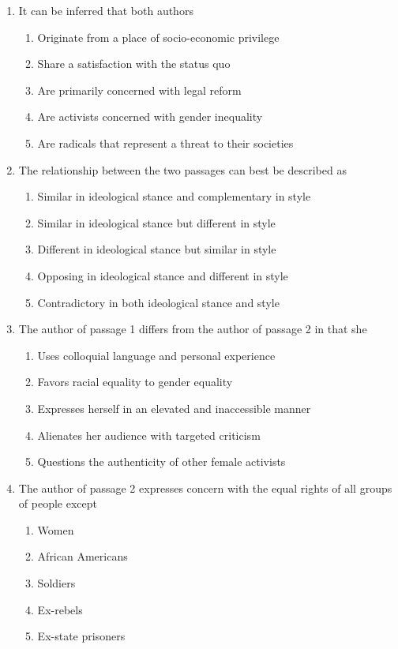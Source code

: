 \documentclass[12pt]{book}
\begin{document}
\bigskip
\begin{enumerate}
\item It can be inferred that both authors
\begin{enumerate}[label=(\Alph*)]
\item Originate from a place of socio-economic privilege
\item Share a satisfaction with the status quo
\item Are primarily concerned with legal reform
\item Are activists concerned with gender inequality
\item Are radicals that represent a threat to their societies
\end{enumerate}

\newpage
\item The relationship between the two passages can best be described as
\begin{enumerate}[label=(\Alph*)]
\item Similar in ideological stance and complementary in style
\item Similar in ideological stance but different in style
\item Different in ideological stance but similar in style
\item Opposing in ideological stance and different in style
\item Contradictory in both ideological stance and style
\end{enumerate}

\bigskip
\item The author of passage 1 differs from the author of passage 2 in that she
\begin{enumerate}[label=(\Alph*)]
\item Uses colloquial language and personal experience
\item Favors racial equality to gender equality
\item Expresses herself in an elevated and inaccessible manner
\item Alienates her audience with targeted criticism
\item Questions the authenticity of other female activists
\end{enumerate}

\bigskip
\item The author of passage 2 expresses concern with the equal rights of all groups of people except
\begin{enumerate}[label=(\Alph*)]
\item Women
\item African Americans
\item Soldiers
\item Ex-rebels
\item Ex-state prisoners
\end{enumerate}


\end{enumerate}
\end{document}
